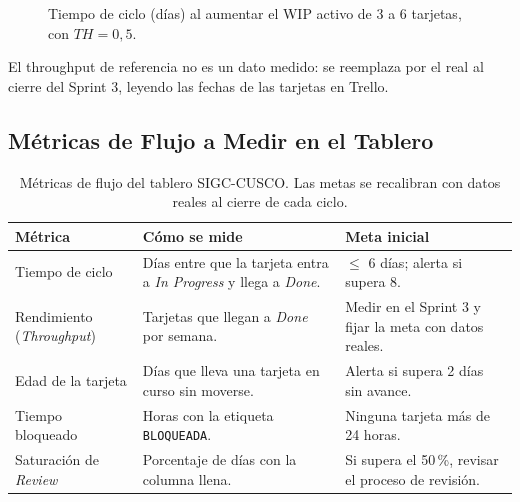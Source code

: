\documentclass[11pt,a4paper]{article}
\begin{document}
\begin{figure}[H]
\centering
{}
\caption{Tiempo de ciclo (días) al aumentar el WIP activo de 3 a 6 tarjetas, con $TH = 0{,}5$.}
\label{fig:little}
\end{figure}

El throughput de referencia no es un dato medido: se reemplaza por el real al cierre del Sprint 3, leyendo las fechas de las tarjetas en Trello.

\subsection{Métricas de Flujo a Medir en el Tablero}

\begin{table}[H]
\centering
\small
\renewcommand{\arraystretch}{1.2}
\begin{tabularx}{\textwidth}{P{3.0cm}YP{3.6cm}}
\toprule
\textbf{Métrica} & \textbf{Cómo se mide} & \textbf{Meta inicial} \\
\midrule
Tiempo de ciclo & Días entre que la tarjeta entra a \textit{In Progress} y llega a \textit{Done}. & $\le$ 6 días; alerta si supera 8. \\
Rendimiento (\textit{Throughput}) & Tarjetas que llegan a \textit{Done} por semana. & Medir en el Sprint 3 y fijar la meta con datos reales. \\
Edad de la tarjeta & Días que lleva una tarjeta en curso sin moverse. & Alerta si supera 2 días sin avance. \\
Tiempo bloqueado & Horas con la etiqueta \texttt{BLOQUEADA}. & Ninguna tarjeta más de 24 horas. \\
Saturación de \textit{Review} & Porcentaje de días con la columna llena. & Si supera el 50\,\%, revisar el proceso de revisión. \\
\bottomrule
\end{tabularx}
\caption{Métricas de flujo del tablero SIGC-CUSCO. Las metas se recalibran con datos reales al cierre de cada ciclo.}
\label{tab:metricas}
\end{table}
\end{document}
